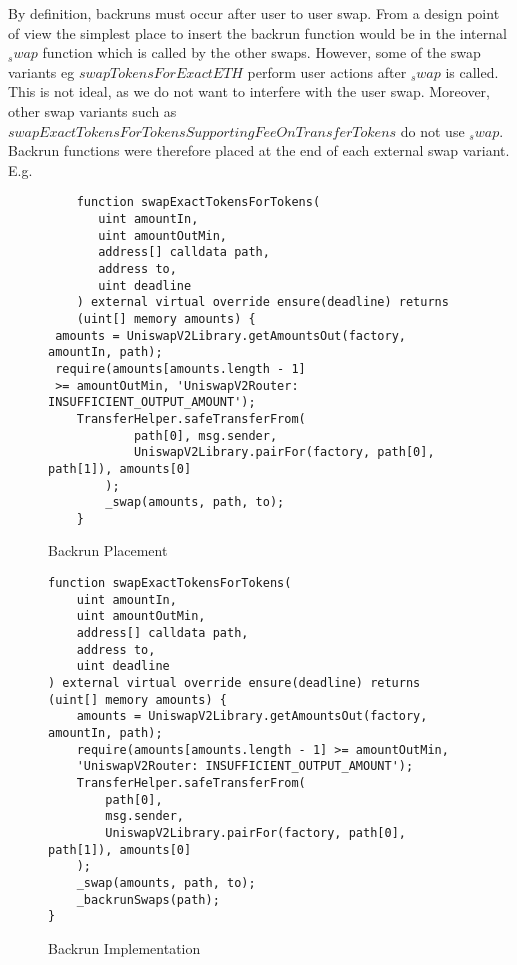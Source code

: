 \documentclass[runningheads]{llncs}
\begin{document}
By definition, backruns must occur after user to user swap. From a design point of view the simplest place to insert the backrun function would be in the internal $_swap$ function which is called by the other swaps. However, some of the swap variants eg $swapTokensForExactETH$ perform user actions after $_swap$ is called. This is not ideal, as we do not want to interfere with the user swap. Moreover, other swap variants such as $swapExactTokensForTokensSupportingFeeOnTransferTokens$ do not use $_swap$. Backrun functions were therefore placed at the end of each external swap variant. E.g.
\begin{figure}
    \centering
    \caption{Backrun Placement}
    \label{fig:Backrun Placement}
\label{Before swapExactTokensforTokens:1}
\begin{verbatim}
    function swapExactTokensForTokens(
       uint amountIn,
       uint amountOutMin,
       address[] calldata path,
       address to,
       uint deadline
    ) external virtual override ensure(deadline) returns 
    (uint[] memory amounts) {
 amounts = UniswapV2Library.getAmountsOut(factory, amountIn, path);
 require(amounts[amounts.length - 1] 
 >= amountOutMin, 'UniswapV2Router: INSUFFICIENT_OUTPUT_AMOUNT');
    TransferHelper.safeTransferFrom(
            path[0], msg.sender, 
            UniswapV2Library.pairFor(factory, path[0], path[1]), amounts[0]
        );
        _swap(amounts, path, to);
    }
\end{verbatim}
\end{figure}


\begin{figure}
    \centering
    \caption{Backrun Implementation}
    \label{fig:Backrun Implementation}
\label{After swapExactTokensforTokens:2}
\begin{verbatim}
function swapExactTokensForTokens(
    uint amountIn,
    uint amountOutMin,
    address[] calldata path,
    address to,
    uint deadline
) external virtual override ensure(deadline) returns (uint[] memory amounts) {
    amounts = UniswapV2Library.getAmountsOut(factory, amountIn, path);
    require(amounts[amounts.length - 1] >= amountOutMin, 
    'UniswapV2Router: INSUFFICIENT_OUTPUT_AMOUNT');
    TransferHelper.safeTransferFrom(
        path[0],
        msg.sender, 
        UniswapV2Library.pairFor(factory, path[0], path[1]), amounts[0]
    );
    _swap(amounts, path, to);
    _backrunSwaps(path);
}
\end{verbatim}
\end{figure}
\end{document}
